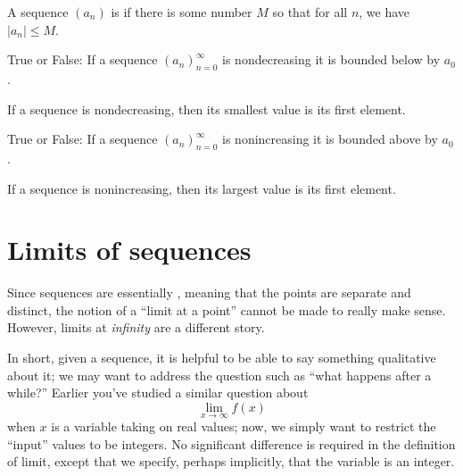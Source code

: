 \documentclass{ximera}
\begin{document}
\begin{definition}
  \label{definition:sequence-bounded}
  A sequence $(a_n)$ is  if there is some number $M$ so
  that for all $n$, we have $|a_n|\le M$.
\end{definition}

\begin{question}
  True or False: If a sequence $(a_n)_{n=0}^\infty$ is nondecreasing
  it is bounded below by $a_0$.
  \begin{prompt}
    \begin{multipleChoice}
    \end{multipleChoice}
  \end{prompt}
  \begin{feedback}
    If a sequence is nondecreasing, then its smallest value is its
    first element.
  \end{feedback}
\end{question}


\begin{question}
  True or False: If a sequence $(a_n)_{n=0}^\infty$ is nonincreasing
  it is bounded above by $a_0$.
  \begin{prompt}
    \begin{multipleChoice}
    \end{multipleChoice}
  \end{prompt}
  \begin{feedback}
    If a sequence is nonincreasing, then its largest value is its
    first element.
  \end{feedback}
\end{question}



\section{Limits of sequences}

Since sequences are essentially , meaning that the points
are separate and distinct, the notion of a ``limit at a point'' cannot
be made to really make sense. However, limits at \textit{infinity} are
a different story.

In short, given a sequence, it is helpful to be able to say something
qualitative about it; we may want to address the question such as
``what happens after a while?''  Earlier you've studied a similar
question about
\[
\lim_{x\to\infty} f(x)
\]
when $x$ is a variable taking on real values; now, we simply want to
restrict the ``input'' values to be integers. No significant
difference is required in the definition of limit, except that we
specify, perhaps implicitly, that the variable is an integer.
\end{document}
